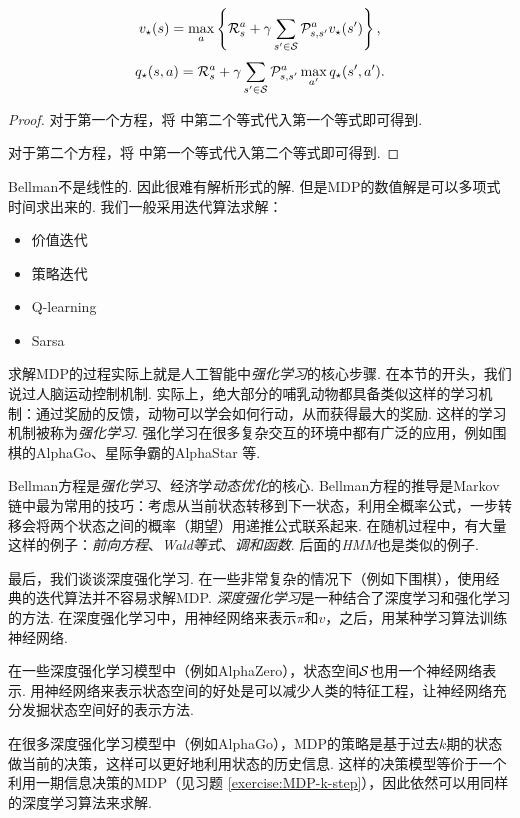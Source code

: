 \begin{theorem}[Bellman方程]
\[v_\star(s) = \max_a\left\{\mathcal R_s^a + \gamma \sum_{s'\in \mathcal S}\mathcal P_{s,s'}^av_\star(s')\right\},\]
\[q_\star(s,a) = \mathcal R_s^a+\gamma \sum_{s'\in \mathcal S}\mathcal P_{s,s'}^a\max_{a'}q_\star(s',a').\]
\end{theorem}
\begin{proof}
    对于第一个方程，将 中第二个等式代入第一个等式即可得到. 

    对于第二个方程，将 中第一个等式代入第二个等式即可得到. 
\end{proof}

Bellman不是线性的. 因此很难有解析形式的解. 但是MDP的数值解是可以多项式时间求出来的. 我们一般采用迭代算法求解：
\begin{itemize}
    \item 价值迭代
    \item 策略迭代
    \item Q-learning
    \item Sarsa
\end{itemize}

求解MDP的过程实际上就是人工智能中\emph{强化学习}的核心步骤. 在本节的开头，我们说过人脑运动控制机制. 实际上，绝大部分的哺乳动物都具备类似这样的学习机制：通过奖励的反馈，动物可以学会如何行动，从而获得最大的奖励. 这样的学习机制被称为\emph{强化学习}. 强化学习在很多复杂交互的环境中都有广泛的应用，例如围棋的AlphaGo、星际争霸的AlphaStar 等.

\begin{remark}
Bellman方程是\emph{强化学习}、经济学\emph{动态优化}的核心. Bellman方程的推导是Markov链中最为常用的技巧：考虑从当前状态转移到下一状态，利用全概率公式，一步转移会将两个状态之间的概率（期望）用递推公式联系起来. 在随机过程中，有大量这样的例子：\emph{前向方程}、\emph{Wald等式}、\emph{调和函数}. 后面的\emph{HMM}也是类似的例子.    
\end{remark}

最后，我们谈谈深度强化学习. 在一些非常复杂的情况下（例如下围棋），使用经典的迭代算法并不容易求解MDP. \emph{深度强化学习}是一种结合了深度学习和强化学习的方法. 在深度强化学习中，用神经网络来表示$\pi$和$v$，之后，用某种学习算法训练神经网络. 

在一些深度强化学习模型中（例如AlphaZero），状态空间$\mathcal S$也用一个神经网络表示. 用神经网络来表示状态空间的好处是可以减少人类的特征工程，让神经网络充分发掘状态空间好的表示方法.

在很多深度强化学习模型中（例如AlphaGo），MDP的策略是基于过去$k$期的状态做当前的决策，这样可以更好地利用状态的历史信息. 这样的决策模型等价于一个利用一期信息决策的MDP（见习题 \ref{exercise:MDP-k-step}），因此依然可以用同样的深度学习算法来求解. 


